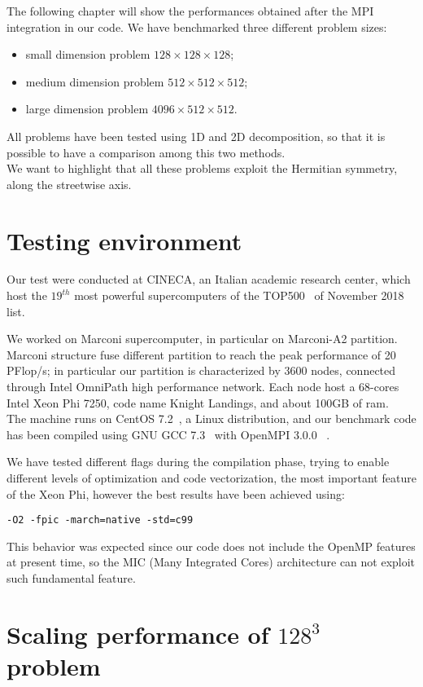 The following chapter will show the performances obtained after the MPI integration in our code.
We have benchmarked three different problem sizes:
\begin{itemize}
\item small dimension problem $128\times 128 \times 128$;
\item medium dimension problem $512\times 512\times 512$;
\item large dimension problem $4096\times 512\times 512$.  
\end{itemize}
All problems have been tested using 1D and 2D decomposition, so that it is possible to have a comparison among this two methods.
\\
We want to highlight that all these problems exploit the Hermitian symmetry, along the streetwise axis.
\section{Testing environment}
Our test were conducted at CINECA\cite{Cineca}, an Italian academic research center, which host the $19^{th}$ most powerful supercomputers of the TOP500~\cite{top500} of November 2018 list.

We worked on Marconi\cite{marconi:specs} supercomputer, in particular on Marconi-A2 partition.
Marconi structure fuse different partition to reach the peak performance of 20 PFlop/s; in particular our partition is characterized by 3600 nodes, connected through Intel OmniPath\cite{intel:intelmpivsopenmpi} high performance network. Each node host a 68-cores Intel Xeon Phi 7250, code name Knight Landings, and about 100GB of ram. \\
The machine runs on CentOS 7.2~\cite{centos}, a Linux distribution, and our benchmark code has been compiled using GNU GCC 7.3~\cite{gcc} with OpenMPI 3.0.0~\cite{openmpi}\cite{MPI:standard3} . \\
\par
We have tested different flags during the compilation phase, trying to enable different levels of optimization and code vectorization, the most important feature of the Xeon Phi, however the best results have been achieved using:
\begin{lstlisting}
-O2 -fpic -march=native -std=c99
\end{lstlisting}
This behavior was expected since our code does not include the OpenMP\cite{openmp} features at present time, so the MIC\cite{mic} (Many Integrated Cores) architecture can not exploit such fundamental feature.



\section{Scaling performance of $128^3$ problem}

